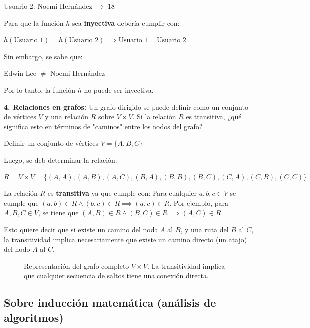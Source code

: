 \documentclass{article}
\begin{document}
Usuario 2: Noemi Hernández $\to$ 18

Para que la función $h$ sea \textbf{inyectiva} debería cumplir con:

$h(\text{Usuario 1}) = h(\text{Usuario 2}) \implies \text{Usuario 1} = \text{Usuario 2}$

Sin embargo, se sabe que: 

Edwin Lee $\neq$ Noemi Hernández

Por lo tanto, la función $h$ no puede ser inyectiva.

\textbf{4. Relaciones en grafos:} Un grafo dirigido se puede definir como un conjunto de vértices $V$ y una relación $R$ sobre $V \times V$. Si la relación $R$ es transitiva, ¿qué significa esto en términos de "caminos" entre los nodos del grafo?

Definir un conjunto de vértices $V = \{A, B, C\}$

Luego, se deb determinar la relación:

$R = V \times V = \{(A, A), (A, B), (A, C), (B, A), (B, B), (B, C), (C, A), (C, B), (C, C)\}$

La relación $R$ es \textbf{transitiva} ya que cumple con: Para cualquier $a, b, c \in V$ se cumple que $(a, b) \in R \land (b, c) \in R \implies (a, c) \in R$. Por ejemplo, para $A, B, C \in V$, se tiene que $(A, B) \in R \land (B, C) \in R \implies (A, C) \in R$.

Esto quiere decir que si existe un camino del nodo $A$ al $B$, y una ruta del $B$ al $C$, la transitividad implica necesariamente que existe un camino directo (un atajo) del nodo $A$ al $C$.

\begin{figure}[h!]
\centering
{}
\caption{Representación del grafo completo $V \times V$. La transitividad implica que cualquier secuencia de saltos tiene una conexión directa.}
\end{figure}

\subsection{Sobre inducción matemática (análisis de algoritmos)}
\end{document}
